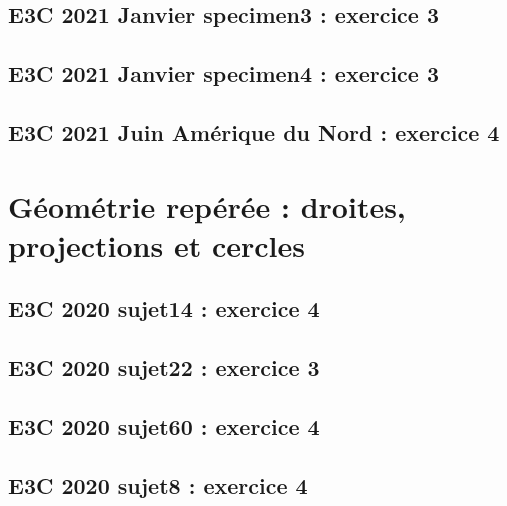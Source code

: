 \documentclass[lang=fr,edition=teacher,layout=sheet]{mxbook}
\begin{document}
\subsection*{E3C 2021 Janvier specimen3 : exercice 3}
\begingroup\endgroup
\par\bigskip
{}\subsection*{E3C 2021 Janvier specimen4 : exercice 3}
\begingroup\endgroup
\par\bigskip
{}\subsection*{E3C 2021 Juin Amérique du Nord : exercice 4}
\begingroup\endgroup
\par\bigskip
\clearpage\section*{Géométrie repérée : droites, projections et cercles}
\subsection*{E3C 2020 sujet14 : exercice 4}
\begingroup\endgroup
\par\bigskip
{}\subsection*{E3C 2020 sujet22 : exercice 3}
\begingroup\endgroup
\par\bigskip
{}\subsection*{E3C 2020 sujet60 : exercice 4}
\begingroup\endgroup
\par\bigskip
{}\subsection*{E3C 2020 sujet8 : exercice 4}
\end{document}
